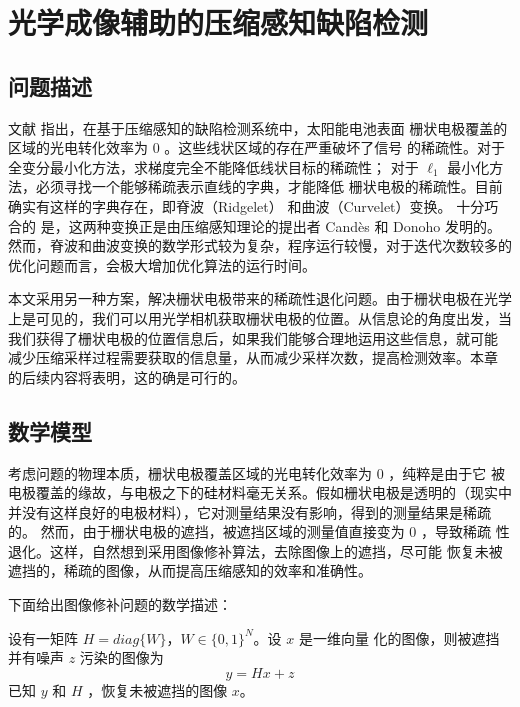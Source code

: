 \chapter{光学成像辅助的压缩感知缺陷检测}

\section{问题描述}

文献 \cite{XDUCLBIC} 指出，在基于压缩感知的缺陷检测系统中，太阳能电池表面
栅状电极覆盖的区域的光电转化效率为 $0$ 。这些线状区域的存在严重破坏了信号
的稀疏性。对于全变分最小化方法，求梯度完全不能降低线状目标的稀疏性；
对于 $\ell_1$ 最小化方法，必须寻找一个能够稀疏表示直线的字典，才能降低
栅状电极的稀疏性。目前确实有这样的字典存在，即脊波（Ridgelet）
和曲波（Curvelet）变换。\cite{ridgelet}\cite{curvelet} 十分巧合的
是，这两种变换正是由压缩感知理论的提出者 Cand\`es 和 Donoho 发明的。
然而，脊波和曲波变换的数学形式较为复杂，程序运行较慢，对于迭代次数较多的
优化问题而言，会极大增加优化算法的运行时间。

本文采用另一种方案，解决栅状电极带来的稀疏性退化问题。由于栅状电极在光学
上是可见的，我们可以用光学相机获取栅状电极的位置。从信息论的角度出发，当
我们获得了栅状电极的位置信息后，如果我们能够合理地运用这些信息，就可能
减少压缩采样过程需要获取的信息量，从而减少采样次数，提高检测效率。本章
的后续内容将表明，这的确是可行的。

\section{数学模型}

考虑问题的物理本质，栅状电极覆盖区域的光电转化效率为 $0$ ，纯粹是由于它
被电极覆盖的缘故，与电极之下的硅材料毫无关系。假如栅状电极是透明的（现实中
并没有这样良好的电极材料），它对测量结果没有影响，得到的测量结果是稀疏的。
然而，由于栅状电极的遮挡，被遮挡区域的测量值直接变为 $0$ ，导致稀疏
性退化。这样，自然想到采用图像修补算法，去除图像上的遮挡，尽可能
恢复未被遮挡的，稀疏的图像，从而提高压缩感知的效率和准确性。

下面给出图像修补问题的数学描述：
\begin{problem}[图像修补]
设有一矩阵 $H = diag\{W\}$，$W \in \{0,1\}^{N}$。设 $x$ 是一维向量
化的图像，则被遮挡并有噪声 $z$ 污染的图像为
\begin{equation}
y = Hx + z
\end{equation}
已知 $y$ 和 $H$ ，恢复未被遮挡的图像 $x$。
\end{problem}

